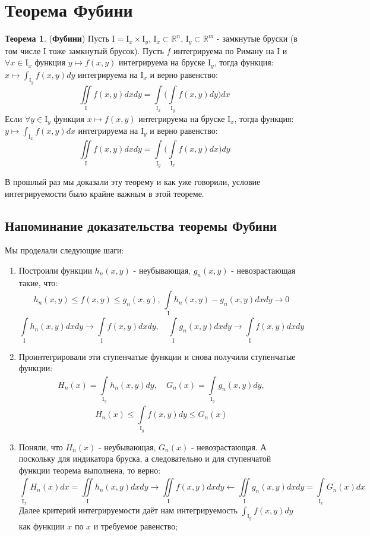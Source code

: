 \documentclass[12pt]{article}
\newcommand{\RN}[1]{%
	\textup{\uppercase\expandafter{\romannumeral#1}}%
}
\newcommand{\MR}{\mathbb{R}}
\newcommand{\MI}{\mathrm{I}}
\theoremstyle{definition}
\newtheorem{theorem}{Теорема}
\newcommand{\ddint}[2]{\displaystyle\int\limits_{#1}^{#2}}
\begin{document}
\lhead{Математический анализ - \RN{4}}

\section*{Теорема Фубини}

\begin{theorem}(\textbf{Фубини})
	Пусть $\MI = \MI_x \times \MI_y$, $\MI_x \subset \MR^n, \, \MI_y \subset \MR^m$ - замкнутые бруски (в том числе $\MI$ тоже замкнутый брусок). Пусть $f$ интегрируема по Риману на $\MI$ и $\forall x \in \MI_x$ функция $y \mapsto f(x,y)$ интегрируема на бруске $\MI_y$, тогда функция: $x \mapsto \int_{\MI_y}f(x,y)dy$ интегрируема на $\MI_x$ и верно равенство:
	$$
		\iint\limits_{\MI} f(x,y)dxdy = \int\limits_{\MI_x}\Bigg(\int\limits_{\MI_y}f(x,y)dy\Bigg)dx
	$$
	Если $\forall y \in \MI_y$ функция $x \mapsto f(x,y)$ интегрируема на бруске $\MI_x$, тогда функция: $y \mapsto \int_{\MI_x}f(x,y)dx$ интегрируема на $\MI_y$ и верно равенство:
	$$
		\iint\limits_{\MI} f(x,y)dxdy = \int\limits_{\MI_y}\Bigg(\int\limits_{\MI_x}f(x,y)dx\Bigg)dy
	$$
\end{theorem}

В прошлый раз мы доказали эту теорему и как уже говорили, условие интегрируемости было крайне важным в этой теореме. 
\subsection*{Напоминание доказательства теоремы Фубини}
Мы проделали следующие шаги:
\begin{enumerate}[label=\arabic*)]
	\item Построили функции $h_n(x,y)$ - неубывающая, $g_n(x,y)$ - невозрастающая такие, что: 
	$$
		h_n(x,y) \leq f(x,y) \leq g_n(x,y), \, \ddint{\MI}{}h_n(x,y) - g_n(x,y)dxdy \to 0
	$$ 
	$$
		\ddint{\MI}{}h_n(x,y)dxdy \to \ddint{\MI}{}f(x,y)dxdy,  \quad \ddint{\MI}{}g_n(x,y)dxdy \to \ddint{\MI}{}f(x,y)dxdy
	$$
	\item Проинтегрировали эти ступенчатые функции и снова получили ступенчатые функции:
	$$
		H_n(x) = \ddint{\MI_y}{}h_n(x,y)dy, \quad G_n(x) = \ddint{\MI_y}{}g_n(x,y)dy,
	$$
	$$
		H_n(x) \leq \ddint{\MI_y}{}f(x,y)dy \leq G_n(x)
	$$
	\item Поняли, что $H_n(x)$ - неубывающая, $G_n(x)$ - невозрастающая. А поскольку для индикатора бруска, а следовательно и для ступенчатой функции теорема выполнена, то верно:
	$$
		\ddint{\MI_x}{}H_n(x)dx = \iint\limits_{\MI}{}h_n(x,y)dxdy \to \iint\limits_{\MI}{}f(x,y)dxdy \gets \iint\limits_{\MI}{}g_n(x,y)dxdy = \ddint{\MI_x}{}G_n(x)dx 
	$$
	Далее критерий интегрируемости даёт нам интегрируемость $\int_{\MI_y}{}f(x,y)dy$ как функции $x$ по $x$ и требуемое равенство;
\end{enumerate}
\end{document}

